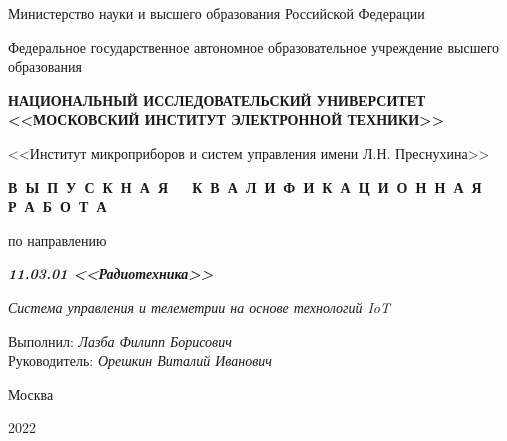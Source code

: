 \thispagestyle{empty}
\setcounter{page}{1}

\begin{center}
    Министерство науки  и высшего образования Российской Федерации

    \vspace{1ex}

    Федеральное государственное автономное образовательное учреждение высшего образования

    \textbf{НАЦИОНАЛЬНЫЙ ИССЛЕДОВАТЕЛЬСКИЙ УНИВЕРСИТЕТ <<МОСКОВСКИЙ ИНСТИТУТ ЭЛЕКТРОННОЙ ТЕХНИКИ>>}

    \vspace{1ex}

    <<Институт микроприборов и систем управления имени Л.Н. Преснухина>>
\end{center}

\vspace{22ex}

\begin{center}
    \textbf{В\ Ы\ П\ У\ С\ К\ Н\ А\ Я\ \ \ К\ В\ А\ Л\ И\ Ф\ И\ К\ А\ Ц\ И\ О\ Н\ Н\ А\ Я\ \ \ Р\ А\ Б\ О\ Т\ А}
    \vspace{1ex}

    по направлению

    \textbf{\textit{11.03.01 <<Радиотехника>>}}
    
    \textit{Система управления и телеметрии на основе технологий IoT}

\end{center}

\vspace{25ex}

\begin{flushright}
    \noindent
    Выполнил: \textit{Лазба Филипп Борисович} \\
    Руководитель: \textit{Орешкин Виталий Иванович}
\end{flushright}

\vfill

\begin{center}
    Москва

    2022
\end{center}

\newpage
